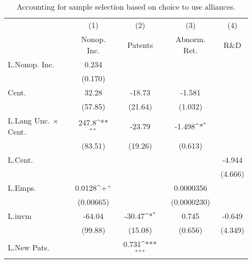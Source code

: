 \begin{table}
\begin{center}
\caption[Sample Selection on Alliance Use]{Accounting for sample selection based on choice to use alliances.\label{sel1}}
\vspace{0.3in}
{
\def\sym#1{\ifmmode^{#1}\else\(^{#1}\)\fi}
\begin{tabular}{l*{4}{c}}
\hline\hline
                    &\multicolumn{1}{c}{(1)}&\multicolumn{1}{c}{(2)}&\multicolumn{1}{c}{(3)}&\multicolumn{1}{c}{(4)}\\
                    &\multicolumn{1}{c}{Nonop. Inc.}&\multicolumn{1}{c}{Patents}&\multicolumn{1}{c}{Abnorm. Ret.}&\multicolumn{1}{c}{R\&D}\\
\hline
L.Nonop. Inc.       &       0.234         &                     &                     &                     \\
                    &     (0.170)         &                     &                     &                     \\
Cent.               &       32.28         &      -18.73         &      -1.581         &                     \\
                    &     (57.85)         &     (21.64)         &     (1.032)         &                     \\
L.Lang Unc. $\times$ Cent.&       247.8\sym{**} &      -23.79         &      -1.498\sym{*}  &                     \\
                    &     (83.51)         &     (19.26)         &     (0.613)         &                     \\
L.Cent.             &                     &                     &                     &      -4.944         \\
                    &                     &                     &                     &     (4.666)         \\
L.Emps.             &      0.0128\sym{+}  &                     &   0.0000356         &                     \\
                    &   (0.00665)         &                     & (0.0000230)         &                     \\
L.invm              &      -64.04         &      -30.47\sym{*}  &       0.745         &      -0.649         \\
                    &     (99.88)         &     (15.08)         &     (0.656)         &     (4.349)         \\
L.New Pats.         &                     &       0.731\sym{***}&                     &                     \\

\end{tabular}}
\end{center}
\end{table}
